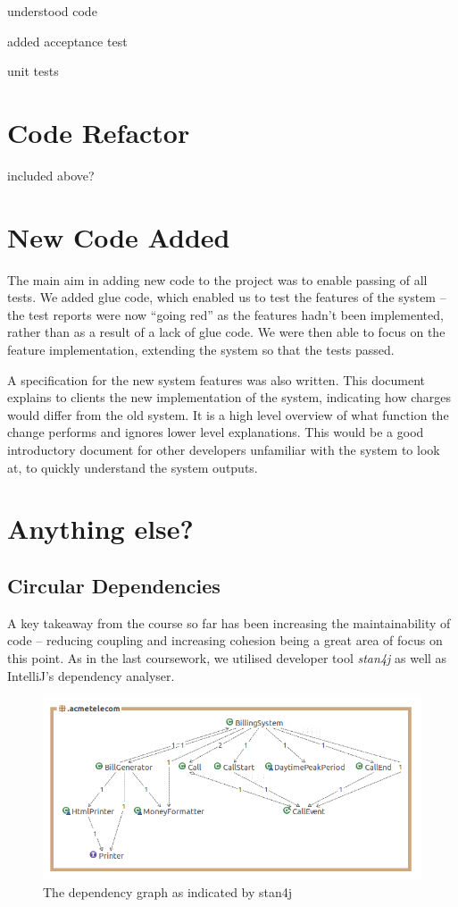 \documentclass[a4paper]{article}
\begin{document}
understood code

added acceptance test

unit tests

\section{Code Refactor}
included above?

\section{New Code Added}

The main aim in adding new code to the project was to enable passing of all tests.
We added glue code, which enabled us to test the features of the
system -- the test reports were now ``going red'' as the features hadn't been implemented,
rather than as a result of a lack of glue code. We were then able to focus on the
feature implementation, extending the system so that the tests passed. 

A specification for the new system features was also written. This document explains
to clients the new implementation of the system, indicating how charges would differ
from the old system. It is a high level overview of what function the change performs
and ignores lower level explanations. This would be a good introductory document
for other developers unfamiliar with the system to look at, to quickly understand
the system outputs.

\section{Anything else?}

\subsection{Circular Dependencies}

A key takeaway from the course so far has been increasing the maintainability of
code -- reducing coupling and increasing cohesion being a great area of focus on
this point. As in the last coursework, we utilised developer tool \emph{stan4j} as
well as IntelliJ's dependency analyser.

\begin{figure}[h]
\centering
\includegraphics[width=\textwidth]{dependency_graph}
\caption{The dependency graph as indicated by stan4j}
\end{figure}
\end{document}
